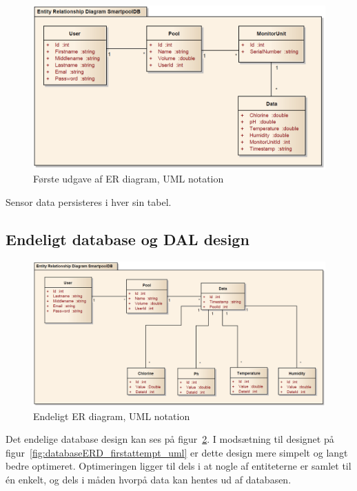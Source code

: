 \begin{figure}[h]
	\centering
	\includegraphics[width=\linewidth]{figs/design/databaseERD_old_uml}
	\caption{Første udgave af ER diagram, UML notation}
	\label{fig:databaseERD_old_uml}
\end{figure}

Sensor data persisteres i hver sin tabel.

\subsection{Endeligt database og DAL design}

\begin{figure}[h]
	\centering
	\includegraphics[width=\linewidth]{figs/design/databaseERD_final_uml}
	\caption{Endeligt ER diagram, UML notation}
	\label{fig:databaseERD_final_uml}
\end{figure}

Det endelige database design kan ses på figur~\ref{fig:databaseERD_final_uml}. I modsætning til designet på figur~\ref{fig:databaseERD_firstattempt_uml} er dette design mere simpelt og langt bedre optimeret. Optimeringen ligger til dels i at nogle af entiteterne er samlet til én enkelt, og dels i måden hvorpå data kan hentes ud af databasen. 

